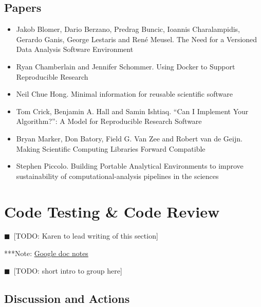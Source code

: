 \documentclass[11pt, oneside]{amsart}
\newcommand{\todo}[1]{{\color{blue}$\blacksquare$~\textsf{[TODO: #1]}}}
\newcommand{\note}[1]{ {\textcolor{blueish}    { ***Note:      #1 }}}
\begin{document}
\subsection{Papers}
\begin{itemize}
\item Jakob Blomer, Dario Berzano, Predrag Buncic, Ioannis Charalampidis,
Gerardo Ganis, George Lestaris and Ren\'{e} Meusel. The Need for a Versioned
Data Analysis Software Environment~\cite{wssspe2_blomer}

\item Ryan Chamberlain and Jennifer Schommer. Using {Docker} to Support
Reproducible Research~\cite{wssspe2_chamberlain}

\item Neil Chue Hong. Minimal information for reusable scientific
software~\cite{wssspe2_chue_hong}

\item Tom Crick, Benjamin A. Hall and Samin Ishtiaq. ``Can I Implement Your
Algorithm?'': A Model for Reproducible Research Software~\cite{wssspe2_crick}

\item Bryan Marker, Don Batory, Field G. Van Zee and Robert van de Geijn. Making
Scientific Computing Libraries Forward Compatible~\cite{wssspe2_marker}

\item Stephen Piccolo. Building Portable Analytical Environments to improve
sustainability of computational-analysis pipelines in the
sciences~\cite{wssspe2_piccolo}
\end{itemize}

\section{Code Testing \& Code Review} \label{sec:code_testing}
\todo{Karen to lead writing of this section}

\note{\href{http://tinyurl.com/l5t5h45}{Google doc notes}}

\todo{short intro to group here}

\subsection{Discussion and Actions}
\end{document}
